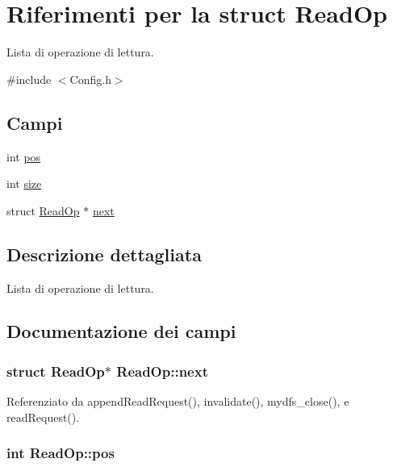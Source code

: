 \hypertarget{structReadOp}{\section{Riferimenti per la struct Read\+Op}
\label{structReadOp}
}


Lista di operazione di lettura.  




{\ttfamily \#include $<$Config.\+h$>$}

\subsection*{Campi}
\begin{DoxyCompactItemize}
\item 
int \hyperlink{structReadOp_a2615c975be53dbd950cb51959009257a}{pos}
\item 
int \hyperlink{structReadOp_a4ed8bd364b1b3378cc6f4faf750da527}{size}
\item 
struct \hyperlink{structReadOp}{Read\+Op} $\ast$ \hyperlink{structReadOp_ac84186a2d784cb2fbd0c71dd7d5df78d}{next}
\end{DoxyCompactItemize}


\subsection{Descrizione dettagliata}
Lista di operazione di lettura. 

\subsection{Documentazione dei campi}
\hypertarget{structReadOp_ac84186a2d784cb2fbd0c71dd7d5df78d}{
\subsubsection[{next}]{\setlength{\rightskip}{0pt plus 5cm}struct {\bf Read\+Op}$\ast$ Read\+Op\+::next}}\label{structReadOp_ac84186a2d784cb2fbd0c71dd7d5df78d}


Referenziato da append\+Read\+Request(), invalidate(), mydfs\+\_\+close(), e read\+Request().

\hypertarget{structReadOp_a2615c975be53dbd950cb51959009257a}{
\subsubsection[{pos}]{\setlength{\rightskip}{0pt plus 5cm}int Read\+Op\+::pos}}\label{structReadOp_a2615c975be53dbd950cb51959009257a}


